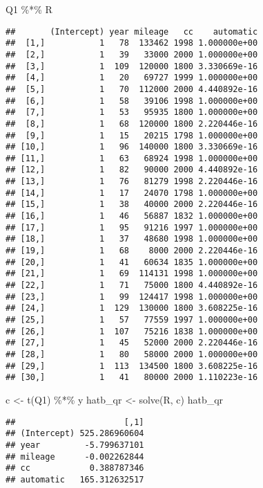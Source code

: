 \documentclass[
]{book}
\newenvironment{Shaded}{\begin{snugshade}}{\end{snugshade}}
\newcommand{\FunctionTok}[1]{\textcolor[rgb]{0.00,0.00,0.00}{#1}}
\newcommand{\NormalTok}[1]{#1}
\newcommand{\OtherTok}[1]{\textcolor[rgb]{0.56,0.35,0.01}{#1}}
\newcommand{\SpecialCharTok}[1]{\textcolor[rgb]{0.00,0.00,0.00}{#1}}
\begin{document}
\begin{Shaded}
\begin{Highlighting}[]
\NormalTok{Q1 }\SpecialCharTok{\%*\%}\NormalTok{ R}
\end{Highlighting}
\end{Shaded}

\begin{verbatim}
##       (Intercept) year mileage   cc    automatic
##  [1,]           1   78  133462 1998 1.000000e+00
##  [2,]           1   39   33000 2000 1.000000e+00
##  [3,]           1  109  120000 1800 3.330669e-16
##  [4,]           1   20   69727 1999 1.000000e+00
##  [5,]           1   70  112000 2000 4.440892e-16
##  [6,]           1   58   39106 1998 1.000000e+00
##  [7,]           1   53   95935 1800 1.000000e+00
##  [8,]           1   68  120000 1800 2.220446e-16
##  [9,]           1   15   20215 1798 1.000000e+00
## [10,]           1   96  140000 1800 3.330669e-16
## [11,]           1   63   68924 1998 1.000000e+00
## [12,]           1   82   90000 2000 4.440892e-16
## [13,]           1   76   81279 1998 2.220446e-16
## [14,]           1   17   24070 1798 1.000000e+00
## [15,]           1   38   40000 2000 2.220446e-16
## [16,]           1   46   56887 1832 1.000000e+00
## [17,]           1   95   91216 1997 1.000000e+00
## [18,]           1   37   48680 1998 1.000000e+00
## [19,]           1   68    8000 2000 2.220446e-16
## [20,]           1   41   60634 1835 1.000000e+00
## [21,]           1   69  114131 1998 1.000000e+00
## [22,]           1   71   75000 1800 4.440892e-16
## [23,]           1   99  124417 1998 1.000000e+00
## [24,]           1  129  130000 1800 3.608225e-16
## [25,]           1   57   77559 1997 1.000000e+00
## [26,]           1  107   75216 1838 1.000000e+00
## [27,]           1   45   52000 2000 2.220446e-16
## [28,]           1   80   58000 2000 1.000000e+00
## [29,]           1  113  134500 1800 3.608225e-16
## [30,]           1   41   80000 2000 1.110223e-16
\end{verbatim}

\begin{Shaded}
\begin{Highlighting}[]
\NormalTok{c }\OtherTok{\textless{}{-}} \FunctionTok{t}\NormalTok{(Q1) }\SpecialCharTok{\%*\%}\NormalTok{ y}
\NormalTok{hatb\_qr }\OtherTok{\textless{}{-}} \FunctionTok{solve}\NormalTok{(R, c)}
\NormalTok{hatb\_qr}
\end{Highlighting}
\end{Shaded}

\begin{verbatim}
##                      [,1]
## (Intercept) 525.286960604
## year         -5.799637101
## mileage      -0.002262844
## cc            0.388787346
## automatic   165.312632517
\end{verbatim}
\end{document}
